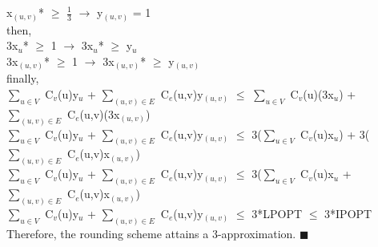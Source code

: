 \documentclass[10pt]{csc_assignment}
\begin{document}
\begin{description}
\begin{flushleft}
x$_{(u, v)}$* $\geqslant$ $\frac{1}{3}$ $\rightarrow$ y$_{(u, v)}$ = 1\\
then,\\
3x$_{u}$* $\geqslant$ 1 $\rightarrow$ 3x$_{u}$* $\geqslant$ y$_{u}$\\
3x$_{(u, v)}$* $\geqslant$ 1 $\rightarrow$ 3x$_{(u, v)}$* $\geqslant$ y$_{(u, v)}$\\
finally,\\
$\sum_{u \in V}$ C$_{v}$(u)y$_{u}$ + $\sum_{(u, v) \in E}$ C$_{e}$(u,v)y$_{(u, v)}$ $\leqslant$
$\sum_{u \in V}$ C$_{v}$(u)(3x$_{u}$) + $\sum_{(u, v) \in E}$ C$_{e}$(u,v)(3x$_{(u, v)}$)\\
$\sum_{u \in V}$ C$_{v}$(u)y$_{u}$ + $\sum_{(u, v) \in E}$ C$_{e}$(u,v)y$_{(u, v)}$ $\leqslant$
3($\sum_{u \in V}$ C$_{v}$(u)x$_{u}$) + 3($\sum_{(u, v) \in E}$ C$_{e}$(u,v)x$_{(u, v)}$)\\
$\sum_{u \in V}$ C$_{v}$(u)y$_{u}$ + $\sum_{(u, v) \in E}$ C$_{e}$(u,v)y$_{(u, v)}$ $\leqslant$
3($\sum_{u \in V}$ C$_{v}$(u)x$_{u}$ + $\sum_{(u, v) \in E}$ C$_{e}$(u,v)x$_{(u, v)}$)\\
$\sum_{u \in V}$ C$_{v}$(u)y$_{u}$ + $\sum_{(u, v) \in E}$ C$_{e}$(u,v)y$_{(u, v)}$ $\leqslant$ 3*LPOPT $\leqslant$ 3*IPOPT\\
Therefore, the rounding scheme attains a 3-approximation. $\blacksquare$\\
\end{flushleft}
\end{description}
\end{document}
